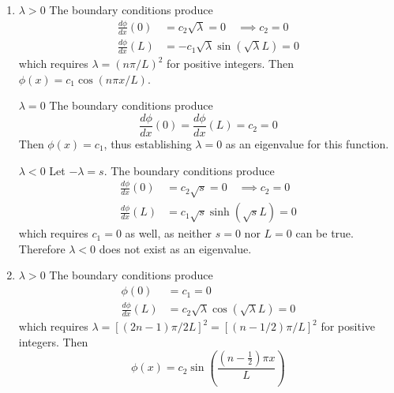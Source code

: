 \documentclass[a4paper]{article}
\begin{document}
\begin{enumerate}[label=(\alph*)]
	\underline{\( \lambda = 0 \)}
	The boundary conditions produce
	\begin{align*}
		\phi \!\left( 0 \right) & = c_{1} = 0 \\
		\phi \!\left( 1 \right) & = c_{2} = 0
	\end{align*}
	leaving us only with the trivial solution, implying that \( \lambda = 0 \) cannot be an eigenvalue.

	\underline{\( \lambda < 0 \)}
	Let \( -\lambda = s \). The boundary conditions produce
	\begin{align*}
		\phi \!\left( 0 \right) & = c_{1} = 0 \\
		\phi \!\left( 1 \right) & = c_{2}\sinh\!\left( \sqrt{s} \right) = 0
	\end{align*}
	which requires either \( s = 0 \) or \( c_{2} = 0 \). We consider only \( s > 0 \) (equivalent with \( \lambda < 0 \)), so we must have \( c_{2} = 0 \), ergo \( \lambda < 0 \) also cannot be an eigenvalue.
	\item \underline{\( \lambda > 0 \)}
	The boundary conditions produce
	\begin{align*}
		\frac{d \phi}{d x}\!\left( 0 \right) & = c_{2}\sqrt{\lambda} = 0 \quad \implies c_{2} = 0 \\
		\frac{d \phi}{d x}\!\left( L \right) & = -c_{1}\sqrt{\lambda}\sin\!\left(\sqrt{\lambda}L\right) = 0
	\end{align*}
	which requires \( \lambda = \!\left( n \pi / L \right)^{2} \) for positive integers. Then \( \phi \!\left( x \right) = c_{1}\cos\!\left(n \pi x / L\right) \).

	\underline{\( \lambda = 0 \)}
	The boundary conditions produce
	\[
		\frac{d \phi}{d x}\!\left( 0 \right) = \frac{d \phi}{d x}\!\left( L \right) = c_{2} = 0
	\]
	Then \( \phi \!\left( x \right) = c_{1} \), thus establishing \( \lambda = 0 \) as an eigenvalue for this function.

	\underline{\( \lambda < 0 \)}
	Let \( -\lambda = s \). The boundary conditions produce
	\begin{align*}
		\frac{d \phi}{d x}\!\left( 0 \right) & = c_{2}\sqrt{s} = 0 \quad \implies c_{2} = 0 \\
		\frac{d \phi}{d x}\!\left( L \right) & = c_{1}\sqrt{s}\sinh\!\left(\sqrt{s}L\right) = 0
	\end{align*}
	which requires \( c_{1} = 0 \) as well, as neither \( s = 0 \) nor \( L = 0 \) can be true. Therefore \( \lambda < 0 \) does not exist as an eigenvalue.
	\item \underline{\( \lambda > 0 \)} The boundary conditions produce
	\begin{align*}
		\phi \!\left( 0 \right) & = c_{1} = 0 \\
		\frac{d \phi}{d x}\!\left( L \right) & = c_{2}\sqrt{\lambda}\cos\!\left(\sqrt{\lambda}L\right) = 0
	\end{align*}
	which requires \( \lambda = \!\left[ \!\left( 2n - 1 \right)\pi / 2L \right]^{2} = \!\left[ \!\left( n - 1/2 \right)\pi / L \right]^{2} \) for positive integers. Then
	\[
		\phi \!\left( x \right) = c_{2}\sin\!\left(\frac{\!\left( n - \frac{1}{2} \right)\pi x}{L}\right) 
	\]


\end{enumerate}
\end{document}
